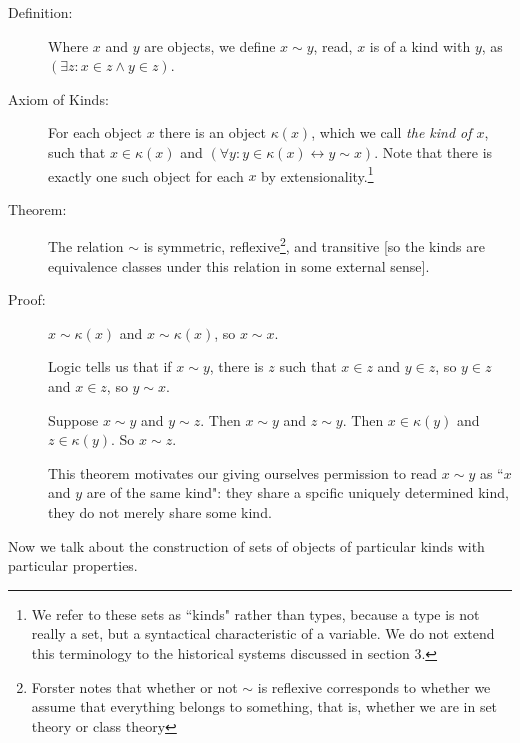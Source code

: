 \documentclass[12pt]{article}
\begin{document}
\begin{description}

\item[Definition:]  Where $x$ and $y$ are objects, we define $x \sim y$, read, $x$ is of a kind with $y$, as $(\exists z:x \in z \wedge y \in z)$.

\item[Axiom of Kinds:]  For each object $x$ there is an object $\kappa(x)$, which we call {\em the kind of $x$}, such that $x \in \kappa(x)$ and $(\forall y:y \in \kappa(x) \leftrightarrow y \sim x)$.  Note that there is exactly one such object for each $x$ by extensionality.\footnote{We refer to these sets as ``kinds" rather than types, because a type is not really a set, but a syntactical characteristic of a variable.  We do not extend this terminology to the historical systems discussed in section 3.}

\item[Theorem:]  The relation $\sim$ is symmetric, reflexive\footnote{Forster notes that whether or not $\sim$ is reflexive corresponds to whether we assume that everything belongs to something, that is, whether we are in set theory or class theory}, and transitive [so the kinds are equivalence classes under this relation in some external sense].

\item[Proof:]  $x \sim \kappa(x)$ and $x \sim \kappa(x)$, so $x \sim x$.

Logic tells us that if $x \sim y$, there is $z$ such that $x \in z$ and $y \in z$, so $y \in z$ and $x \in z$, so $y \sim x$.

Suppose $x \sim y$ and $y \sim z$.  Then $x \sim y$ and $z \sim y$.  Then $x \in \kappa(y)$ and $z \in \kappa(y)$.  So $x \sim z$.

This theorem motivates our giving ourselves permission to read $x \sim y$ as ``$x$ and $y$ are of the same kind":  they share a spcific uniquely determined kind, they do not merely share some kind.

\end{description}

Now we talk about the construction of sets of objects of particular kinds with particular properties.
\end{document}
